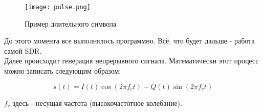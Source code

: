 \begin{figure}[H]
    \centering
    \texttt{[image: pulse.png]}
    \caption{Пример длительного символа}
\end{figure}

До этого момента все выполнялось программно. Всё, что будет дальше - работа самой SDR. \\

Далее происходит генерация непрерывного сигнала. Математически этот процесс можно записать
следующим образом:

$$s(t) = I(t)\cos(2\pi f_c t) - Q(t)\sin(2\pi f_c t)$$

$f_c$ здесь - несущая частота (высокочастотное колебание).

\endinput